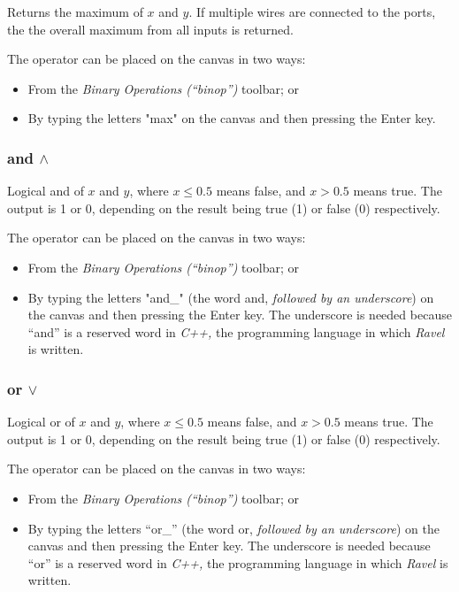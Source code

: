 
\label{Operation:max} Returns the maximum of $x$ and $y$. If multiple
wires are connected to the ports, the the overall maximum from all
inputs is returned.

The operator can be placed on the canvas in two ways:
\begin{itemize}
\item From the \emph{Binary Operations (``binop'') }toolbar; or 
\item By typing the letters "max" on the canvas and then pressing the
Enter key. 
\end{itemize}

\subsubsection{and $\wedge$}


\label{Operation:and_} Logical and of $x$ and $y$, where $x\le0.5$
means false, and $x>0.5$ means true. The output is 1 or 0, depending
on the result being true (1) or false (0) respectively.

The operator can be placed on the canvas in two ways:
\begin{itemize}
\item From the \emph{Binary Operations (``binop'') }toolbar; or 
\item By typing the letters "and\_" (the word and, \emph{followed by an
underscore}) on the canvas and then pressing the Enter key. The underscore
is needed because ``and'' is a reserved word in \emph{C++,} the
programming language in which \emph{Ravel} is written.
\end{itemize}

\subsubsection{or $\vee$}


\label{Operation:or_} Logical or of $x$ and $y$, where $x\le0.5$
means false, and $x>0.5$ means true. The output is 1 or 0, depending
on the result being true (1) or false (0) respectively.

The operator can be placed on the canvas in two ways:
\begin{itemize}
\item From the \emph{Binary Operations (``binop'') }toolbar; or 
\item By typing the letters ``or\_'' (the word or, \emph{followed by an
underscore}) on the canvas and then pressing the Enter key. The underscore
is needed because ``or'' is a reserved word in \emph{C++,} the programming
language in which \emph{Ravel} is written.
\end{itemize}

